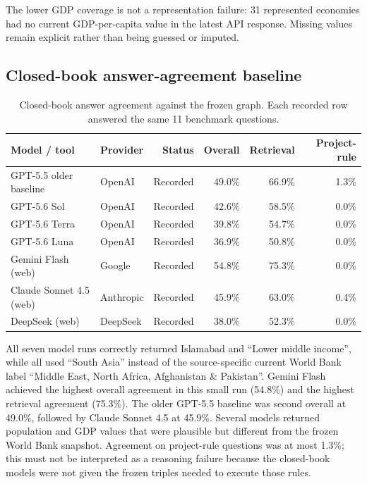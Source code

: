 \documentclass[12pt,a4paper]{article}
\begin{document}
The lower GDP coverage is not a representation failure: 31 represented economies had no current GDP-per-capita value in the latest API response. Missing values remain explicit rather than being guessed or imputed.

\subsection{Closed-book answer-agreement baseline}
\begin{table}[ht]
\centering
\small
\begin{tabular}{llrrrr}
\toprule
Model / tool & Provider & Status & Overall & Retrieval & Project-rule \\
\midrule
GPT-5.5 older baseline & OpenAI & Recorded & 49.0\% & 66.9\% & 1.3\% \\
GPT-5.6 Sol & OpenAI & Recorded & 42.6\% & 58.5\% & 0.0\% \\
GPT-5.6 Terra & OpenAI & Recorded & 39.8\% & 54.7\% & 0.0\% \\
GPT-5.6 Luna & OpenAI & Recorded & 36.9\% & 50.8\% & 0.0\% \\
Gemini Flash (web) & Google & Recorded & 54.8\% & 75.3\% & 0.0\% \\
Claude Sonnet 4.5 (web) & Anthropic & Recorded & 45.9\% & 63.0\% & 0.4\% \\
DeepSeek (web) & DeepSeek & Recorded & 38.0\% & 52.3\% & 0.0\% \\
\bottomrule
\end{tabular}
\caption{Closed-book answer agreement against the frozen graph. Each recorded row answered the same 11 benchmark questions.}
\label{tab:model-results}
\end{table}

All seven model runs correctly returned Islamabad and ``Lower middle income'', while all used ``South Asia'' instead of the source-specific current World Bank label ``Middle East, North Africa, Afghanistan \& Pakistan''. Gemini Flash achieved the highest overall agreement in this small run (54.8\%) and the highest retrieval agreement (75.3\%). The older GPT-5.5 baseline was second overall at 49.0\%, followed by Claude Sonnet 4.5 at 45.9\%. Several models returned population and GDP values that were plausible but different from the frozen World Bank snapshot. Agreement on project-rule questions was at most 1.3\%; this must not be interpreted as a reasoning failure because the closed-book models were not given the frozen triples needed to execute those rules.
\end{document}
